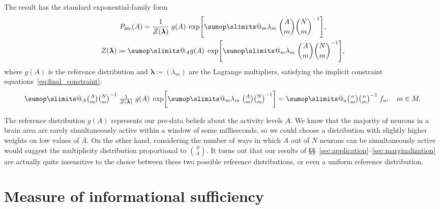 \documentclass[\ifafour a4paper,12pt,\else a5paper,10pt,\fi%
onecolumn,oneside,article,%
british%
]{memoir}
\makeatletter
\theoremstyle{remark}
\theoremstyle{innote}
\def\sum{\DOTSI\sumop\slimits@}
\newcommand*{\defd}{\coloneqq}
\renewcommand*{\|}{\nonscript\,\vert\nonscript\;\mathopen{}}
\newcommand*{\sects}{\S\S}%
\newcommand*{\yAv}{A}
\newcommand*{\yav}{a}
\newcommand*{\yff}{f}
\newcommand*{\ya}{\yav}%
\newcommand*{\yA}{\yAv}%
\newcommand*{\yll}{\bm{\lambda}}
\newcommand*{\yl}{\lambda}
\newcommand*{\px}{P_{\text{me}}}
\makeatother
\begin{document}
The result has the standard exponential-family form
\begin{equation}
  \label{eq:app_maxent_pop}
  \begin{gathered}
  \px(\yA)  = \frac{1}{Z(\yll)}\;
  g(\yA)\;
  \exp\Biggl[\sum_{m}\yl_{m}\;
  \binom{\yA}{m}\binom{N}{m}^{-1}
  \Biggr],
  \\
  Z(\yll)\defd \sum_{\yA}g(\yA)\;
  \exp\Biggl[\sum_{m}\yl_{m}\;
  \binom{\yA}{m}\binom{N}{m}^{-1}
  \Biggr],
\end{gathered}
\end{equation}
where $g(\yA)$ is the reference distribution and $\yll\defd (\yl_{m})$ are
the Lagrange multipliers, satisfying the implicit
constraint equations~\eqref{eq:final_constraint}:
\begin{equation}
  \label{eq:constraint_eq_lambda}
  \sum_{\yA}
  \tbinom{\yA}{m}\tbinom{N}{m}^{-1}\;
  \tfrac{1}{Z(\yll)}\;
  g(\yA)\;
  \exp\biggl[\sum_{m}\yl_{m}\;
  \tbinom{\yA}{m}\tbinom{N}{m}^{-1}
  \biggr]
=
  \sum_{\ya}
  \tbinom{\ya}{m} \tbinom{n}{m}^{-1} \; \yff_{\ya},\quad
  m\in M.
\end{equation}

The reference distribution $g(\yA)$ represents our pre-data beliefs about
the activity levels $\yA$. We know that the majority of neurons in a brain
area are rarely simultaneously active within a window of some milliseconds,
so we could choose a distribution with slightly higher weights on low
values of $\yA$. On the other hand, considering the number of ways in which
$\yA$ out of $N$ neurons can be simultaneously active would suggest the
multiplicity distribution proportional to $\binom{N}{\yA}$. It turns out
that our results of \sects~\ref{sec:application}--\ref{sec:marginalization}
are actually quite insensitive to the choice between these two possible
reference distributions, or even a uniform reference distribution.


\section{Measure of informational sufficiency}
\label{sec:measure_suff}
\end{document}
